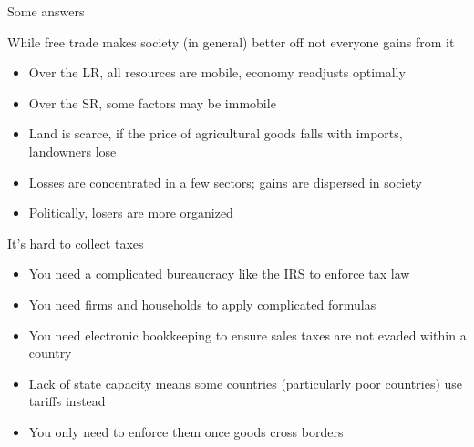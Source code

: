 \documentclass[notes,11pt, aspectratio=169, xcolor=table]{beamer}
\newenvironment{wideitemize}{\itemize\addtolength{\itemsep}{10pt}}{\enditemize}
\begin{document}
\begin{frame}{Some answers}

\begin{wideitemize}
    \item While free trade makes society (in general) better off not everyone gains from it
    \begin{itemize}
    \item Over the LR, all resources are mobile, economy readjusts optimally
    \item Over the SR, some factors may be immobile
   
        \item Land is scarce, if the price of agricultural goods falls with imports, landowners lose
        \item Losses are concentrated in a few sectors; gains are dispersed in society
        \item Politically, losers are more organized
    \end{itemize}
    
    \item<2-> It's hard to collect taxes
    \begin{itemize}
        \item You need a complicated bureaucracy like the IRS to enforce tax law
        \item You need firms and households to apply complicated formulas
        \item You need electronic bookkeeping to ensure sales taxes are not evaded within a country
        \item Lack of state capacity means some countries (particularly poor countries) use tariffs instead
        \item You only need to enforce them once goods cross borders
    \end{itemize}
    

\end{wideitemize}

    
\end{frame}
\end{document}
